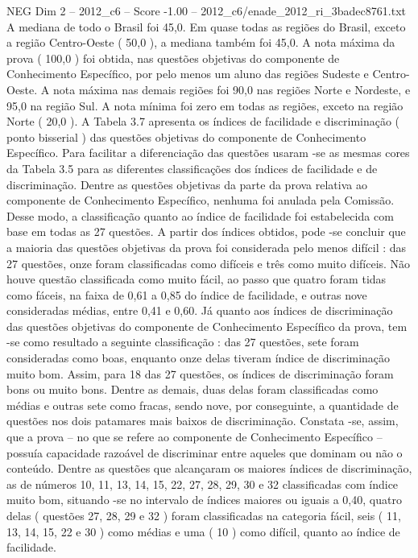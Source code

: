 \begin{textsample}{NEG Dim 2 – 2012\_c6 – Score -1.00 – 2012\_c6/enade\_2012\_ri\_3badec8761.txt}
A mediana de todo o Brasil foi 45,0.
Em quase todas as regiões do Brasil, exceto a região Centro-Oeste ( 50,0 ), a mediana também foi 45,0.
A nota máxima da prova ( 100,0 ) foi obtida, nas questões objetivas do componente de Conhecimento Específico, por pelo menos um aluno das regiões Sudeste e Centro-Oeste.
A nota máxima nas demais regiões foi 90,0 nas regiões Norte e Nordeste, e 95,0 na região Sul.
A nota mínima foi zero em todas as regiões, exceto na região Norte ( 20,0 ).
A Tabela 3.7 apresenta os índices de facilidade e discriminação ( ponto bisserial ) das questões objetivas do componente de Conhecimento Específico.
Para facilitar a diferenciação das questões usaram -se as mesmas cores da Tabela 3.5 para as diferentes classificações dos índices de facilidade e de discriminação.
Dentre as questões objetivas da parte da prova relativa ao componente de Conhecimento Específico, nenhuma foi anulada pela Comissão.
Desse modo, a classificação quanto ao índice de facilidade foi estabelecida com base em todas as 27 questões.
A partir dos índices obtidos, pode -se concluir que a maioria das questões objetivas da prova foi considerada pelo menos difícil : das 27 questões, onze foram classificadas como difíceis e três como muito difíceis.
Não houve questão classificada como muito fácil, ao passo que quatro foram tidas como fáceis, na faixa de 0,61 a 0,85 do índice de facilidade, e outras nove consideradas médias, entre 0,41 e 0,60.
Já quanto aos índices de discriminação das questões objetivas do componente de Conhecimento Específico da prova, tem -se como resultado a seguinte classificação : das 27 questões, sete foram consideradas como boas, enquanto onze delas tiveram índice de discriminação muito bom.
Assim, para 18 das 27 questões, os índices de discriminação foram bons ou muito bons.
Dentre as demais, duas delas foram classificadas como médias e outras sete como fracas, sendo nove, por conseguinte, a quantidade de questões nos dois patamares mais baixos de discriminação.
Constata -se, assim, que a prova – no que se refere ao componente de Conhecimento Específico – possuía capacidade razoável de discriminar entre aqueles que dominam ou não o conteúdo.
Dentre as questões que alcançaram os maiores índices de discriminação, as de números 10, 11, 13, 14, 15, 22, 27, 28, 29, 30 e 32 classificadas com índice muito bom, situando -se no intervalo de índices maiores ou iguais a 0,40, quatro delas ( questões 27, 28, 29 e 32 ) foram classificadas na categoria fácil, seis ( 11, 13, 14, 15, 22 e 30 ) como médias e uma ( 10 ) como difícil, quanto ao índice de facilidade.

\end{textsample}
